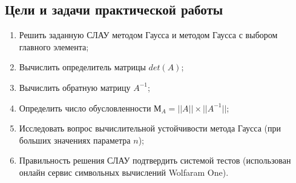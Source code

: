 \documentclass[a4paper,12pt,titlepage,finall]{article}
\begin{document}
\subsection{Цели и задачи практической работы}

\begin{enumerate}
\item
Решить заданную СЛАУ методом Гаусса и методом Гаусса с выбором главного
элемента;
\item
Вычислить определитель матрицы $det(A)$;
\item
Вычислить обратную матрицу $A^{-1}$;
\item
Определить число обусловленности $М_A=||A|| \times ||A^{-1}||$;
\item
Исследовать вопрос вычислительной устойчивости метода Гаусса (при больших
значениях параметра $n$);
\item
Правильность решения СЛАУ подтвердить системой тестов (использован онлайн сервис символьных вычислений Wolfaram One).
\end{enumerate}

\newpage
\end{document}
